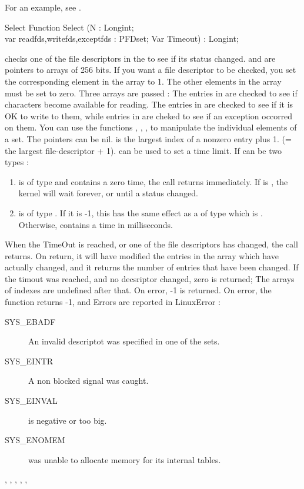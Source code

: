 For an example, see .
\begin{function}{Select}
\Declaration
Function Select (N : Longint; \\ var readfds,writefds,exceptfds : PFDset;
Var Timeout) : Longint;

\Description
{} checks one of the file descriptors in the  to see if its
status changed.
 and  are pointers to arrays of 256
bits. If you want a file descriptor to be checked, you set the
corresponding element in the array to 1. The other elements in the array
must be set to zero. Three arrays are passed : The entries in 
are checked to see if characters become available for reading. The entries
in  are checked to see if it is OK to write to them, while
entries in  are cheked to see if an exception occorred on
them.
You can use the functions , , 
,  to manipulate the individual elements of a set.
The pointers can be nil.
 is the largest index of a nonzero entry plus 1. (= the largest
file-descriptor + 1).
 can be used to set a time limit. 
If  can be two types :
\begin{enumerate}
\item {} is of type  and contains a
zero time, the call returns immediately. If  is , the
kernel will wait forever, or until a status changed.    
\item {} is of type . If it is -1, this has the same
effect as a  of type   which is .
Otherwise,  contains a time in milliseconds.
\end{enumerate}
 
When the TimeOut is reached, or one of the file descriptors has changed,
the  call returns. On return, it will have modified the entries
in the array which have actually changed, and it returns the number of
entries that have been changed. If the timout was reached, and no decsriptor
changed, zero is returned; The arrays of indexes are undefined after that.
On error, -1 is returned.
\Errors
On error, the function returns -1, and Errors are reported in LinuxError :
\begin{description}
\item[SYS\_EBADF\ ] An invalid descriptot was specified in one of the sets.
\item[SYS\_EINTR\ ] A non blocked signal was caught.
\item[SYS\_EINVAL\ ]   is negative or too big.
\item[SYS\_ENOMEM\ ]  was unable to allocate memory for its 
 internal tables.
\end{description}
\SeeAlso
{}, , 
,
,
, 
\end{function}
